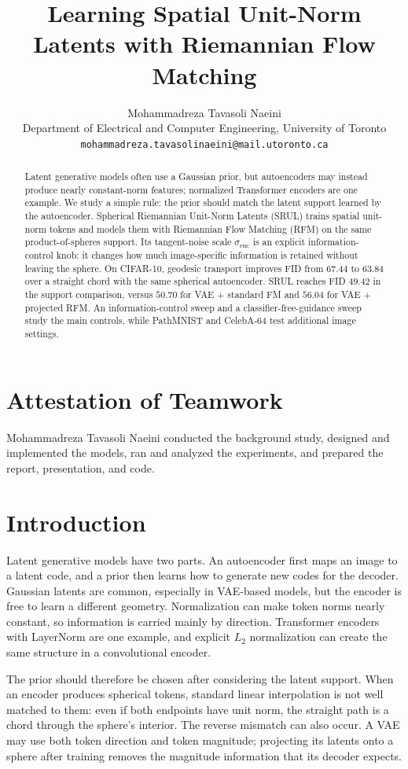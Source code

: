 \documentclass{article}
\title{Learning Spatial Unit-Norm Latents with Riemannian Flow Matching}
\author{Mohammadreza Tavasoli Naeini \\
Department of Electrical and Computer Engineering, University of Toronto \\
\texttt{mohammadreza.tavasolinaeini@mail.utoronto.ca}}
\begin{document}
\maketitle

\begin{abstract}
Latent generative models often use a Gaussian prior, but autoencoders may instead produce nearly constant-norm features; normalized Transformer encoders are one example. We study a simple rule: the prior should match the latent support learned by the autoencoder. Spherical Riemannian Unit-Norm Latents (SRUL) trains spatial unit-norm tokens and models them with Riemannian Flow Matching (RFM) on the same product-of-spheres support. Its tangent-noise scale $\sigma_{\mathrm{enc}}$ is an explicit information-control knob: it changes how much image-specific information is retained without leaving the sphere. On CIFAR-10, geodesic transport improves FID from $67.44$ to $63.84$ over a straight chord with the same spherical autoencoder. SRUL reaches FID $49.42$ in the support comparison, versus $50.70$ for VAE + standard FM and $56.04$ for VAE + projected RFM. An information-control sweep and a classifier-free-guidance sweep study the main controls, while PathMNIST and CelebA-64 test additional image settings.
\end{abstract}

\section*{Attestation of Teamwork}
Mohammadreza Tavasoli Naeini conducted the background study, designed and implemented the models, ran and analyzed the experiments, and prepared the report, presentation, and code.

\section{Introduction}
Latent generative models have two parts. An autoencoder first maps an image to a latent code, and a prior then learns how to generate new codes for the decoder. Gaussian latents are common, especially in VAE-based models, but the encoder is free to learn a different geometry. Normalization can make token norms nearly constant, so information is carried mainly by direction. Transformer encoders with LayerNorm are one example, and explicit $L_2$ normalization can create the same structure in a convolutional encoder.

The prior should therefore be chosen after considering the latent support. When an encoder produces spherical tokens, standard linear interpolation is not well matched to them: even if both endpoints have unit norm, the straight path is a chord through the sphere's interior. The reverse mismatch can also occur. A VAE may use both token direction and token magnitude; projecting its latents onto a sphere after training removes the magnitude information that its decoder expects.
\end{document}
